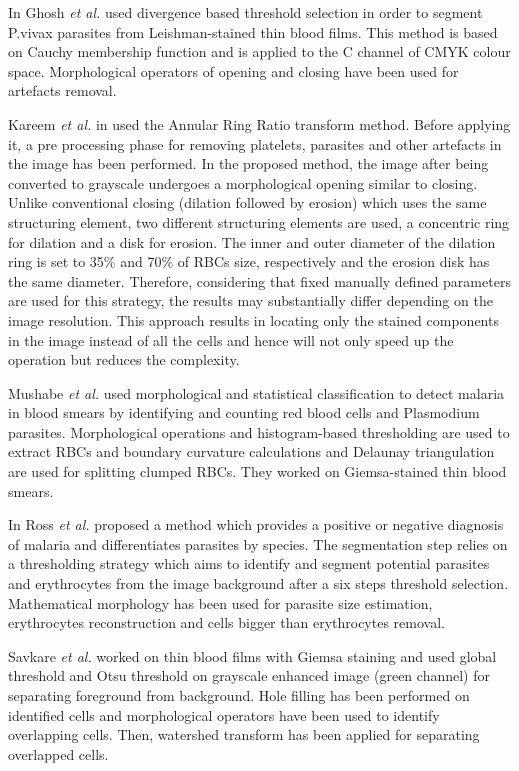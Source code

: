 \documentclass[sensors,review,submit,moreauthors,pdftex,10pt,a4paper]{mdpi}
\begin{document}
In \cite{Ghosh2011} Ghosh \emph{et al.} used divergence based threshold selection in order to segment P.vivax parasites from Leishman-stained thin blood films. This method is based on Cauchy membership function \cite{DiRuberto2014} and is applied to the C channel of CMYK colour space. Morphological operators of opening and closing have been used for artefacts removal.

Kareem \emph{et al.} in \cite{Kareem2011} used the Annular Ring Ratio transform method. Before applying it, a pre processing phase for removing platelets, parasites and other artefacts in the image has been performed. In the proposed method, the image after being converted to grayscale undergoes a morphological opening similar to closing. Unlike conventional closing (dilation followed by erosion) which uses the same structuring element, two different structuring elements are used, a concentric ring for dilation and a disk for erosion. The inner and outer diameter of the dilation ring is set to 35\% and 70\% of RBCs size, respectively and the erosion disk has the same diameter. Therefore, considering that fixed manually defined parameters are used for this strategy, the results may substantially differ depending on the image resolution. This approach results in locating only the stained components in the image instead of all the cells and hence will not only speed up the operation but reduces the complexity.

Mushabe \emph{et al.} \cite{Mushabe2013} used morphological and statistical classification to detect malaria in blood smears by identifying and counting red blood cells and Plasmodium parasites. Morphological operations and histogram-based thresholding are used to extract RBCs and boundary curvature calculations and Delaunay triangulation are used for splitting clumped RBCs. They worked on Giemsa-stained thin blood smears.

In \cite{Ross2006} Ross \emph{et al.} proposed a method which provides a positive or negative diagnosis of malaria and differentiates parasites by species. The segmentation step relies on a thresholding strategy which aims to identify and segment potential parasites and erythrocytes from the image background after a six steps threshold selection. Mathematical morphology has been used for parasite size estimation, erythrocytes reconstruction and cells bigger than erythrocytes removal.

Savkare \emph{et al.} \cite{Savkare2011b} worked on thin blood films with Giemsa staining and used global threshold and Otsu threshold \cite{Otsu1975} on grayscale enhanced image (green channel) for separating foreground from background. Hole filling has been performed on identified cells and morphological operators have been used to identify overlapping cells. Then, watershed transform has been applied for separating overlapped cells.
\end{document}

